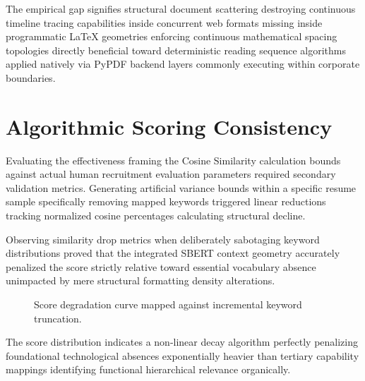 \documentclass[12pt,a4paper]{report}
\begin{document}
The empirical gap signifies structural document scattering destroying continuous timeline tracing capabilities inside concurrent web formats missing inside programmatic LaTeX geometries enforcing continuous mathematical spacing topologies directly beneficial toward deterministic reading sequence algorithms applied natively via PyPDF backend layers commonly executing within corporate boundaries.

\section{Algorithmic Scoring Consistency}
Evaluating the effectiveness framing the Cosine Similarity calculation bounds against actual human recruitment evaluation parameters required secondary validation metrics. Generating artificial variance bounds within a specific resume sample specifically removing mapped keywords triggered linear reductions tracking normalized cosine percentages calculating structural decline. 

Observing similarity drop metrics when deliberately sabotaging keyword distributions proved that the integrated SBERT context geometry accurately penalized the score strictly relative toward essential vocabulary absence unimpacted by mere structural formatting density alterations.

\begin{figure}[H]
    \centering
    \caption{Score degradation curve mapped against incremental keyword truncation.}
\end{figure}

The score distribution indicates a non-linear decay algorithm perfectly penalizing foundational technological absences exponentially heavier than tertiary capability mappings identifying functional hierarchical relevance organically.
\end{document}
